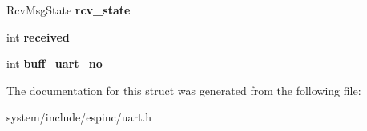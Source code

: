 \begin{DoxyCompactItemize}
\item 
\hypertarget{struct_uart_device_a926d7397e6b1c1274d325de1f5d50772}{}Rcv\+Msg\+State {\bfseries rcv\+\_\+state}\label{struct_uart_device_a926d7397e6b1c1274d325de1f5d50772}

\item 
\hypertarget{struct_uart_device_af8973705d358fe7d10ab6f3c1382a035}{}int {\bfseries received}\label{struct_uart_device_af8973705d358fe7d10ab6f3c1382a035}

\item 
\hypertarget{struct_uart_device_af828558385d4b66a04288b5d631f0501}{}int {\bfseries buff\+\_\+uart\+\_\+no}\label{struct_uart_device_af828558385d4b66a04288b5d631f0501}

\end{DoxyCompactItemize}


The documentation for this struct was generated from the following file\+:\begin{DoxyCompactItemize}
\item 
system/include/espinc/uart.\+h\end{DoxyCompactItemize}

